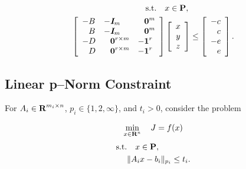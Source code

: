 \documentclass{article}
\begin{document}
    \begin{align*}
        \st\quad &x\in\poly,\\
        \left[\begin{array}{lll}
                -B
            &
                -\eye_m
            &
                \minus \zeros^{m}
            \\
                \minus B
            &
                -\eye_m
            &
                \minus \zeros^{m}
            \\
                -D
            &
                \minus \zeros^{r\times m}
            &
                -\ones^{r}
            \\
                \minus D 
            & 
                \minus \zeros^{r\times m}
            &
                -\ones^{r}
        \end{array}\right]
        &
        \left[\begin{array}{c}
            x   \\
            y   \\
            z
        \end{array}\right]
        \leq
        \left[\begin{array}{l}
            -c                \\
            \minus c      \\
            -e           \\
            \minus e
        \end{array}\right].
    \end{align*}

\subsection{Linear p--Norm Constraint} \label{sec:lin_p_norm}


    For $A_i\in\textbf{R}^{m_i\times n}$, $p_i\in\{1,2,\infty\}$, and $t_i>0$, consider the problem

    \begin{align*}
        \min_{x\in\textbf{R}^n} \quad J = f(x)
    \end{align*}
    \begin{align}
        \text{s.t.}\quad x&\in\textbf{P},\nonumber\\
        \|A_i&x-b_i\|_{p_i}\leq t_i.\label{eqn:p_norm_constraint}
    \end{align}
\end{document}
